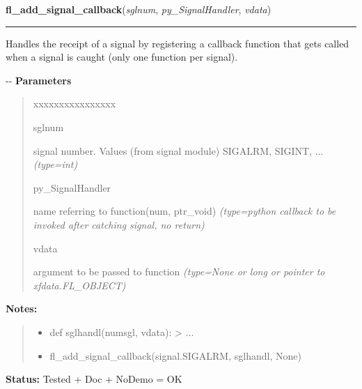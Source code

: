     \label{xformslib:flbasic:fl_add_signal_callback}

    \vspace{0.5ex}

\hspace{.8\funcindent}\begin{boxedminipage}{\funcwidth}

    \raggedright \textbf{fl\_add\_signal\_callback}(\textit{sglnum}, \textit{py\_SignalHandler}, \textit{vdata})

    \vspace{-1.5ex}

    \rule{\textwidth}{0.5\fboxrule}
\setlength{\parskip}{2ex}

Handles the receipt of a signal by registering a callback function that
gets called when a signal is caught (only one function per signal).

-{}-
\setlength{\parskip}{1ex}
      \textbf{Parameters}
      \vspace{-1ex}

      \begin{quote}
        \begin{Ventry}{xxxxxxxxxxxxxxxx}

          \item[sglnum]


signal number. Values (from signal module) SIGALRM, SIGINT, ...
            {\it (type=int)}

          \item[py\_SignalHandler]


name referring to function(num, ptr\_void)
            {\it (type=python callback to be invoked after catching signal, no return)}

          \item[vdata]


argument to be passed to function
            {\it (type=None or long or pointer to xfdata.FL\_OBJECT)}

        \end{Ventry}

      \end{quote}

\textbf{Notes:}
\begin{quote}
  \begin{itemize}

  \item
    \setlength{\parskip}{0.6ex}

def sglhandl(numsgl, vdata): > ...


  \item 
fl\_add\_signal\_callback(signal.SIGALRM, sglhandl, None)


\end{itemize}

\end{quote}

\textbf{Status:} 
Tested + Doc + NoDemo = OK


    \end{boxedminipage}


